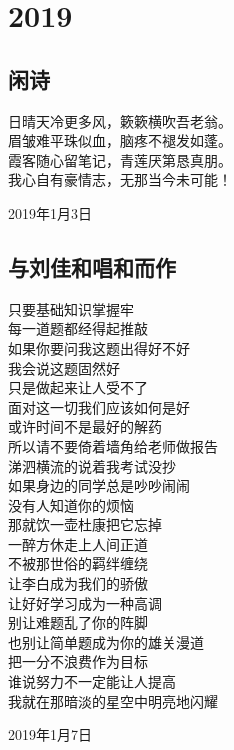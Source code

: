 \documentclass[a5paper]{ctexart}
\begin{document}
	\section{2019}
	
	\subsection{闲诗}
	\begin{center}
		
		日晴天冷更多风，簌簌横吹吾老翁。\\
		眉皱难平珠似血，脑疼不褪发如蓬。\\
		霞客随心留笔记，青莲厌第恳真朋。\\
		我心自有豪情志，无那当今未可能！
	\end{center}
	\hfill 2019年1月3日
	
	\subsection{与刘佳和唱和而作}
	\begin{center}
		只要基础知识掌握牢\\
		每一道题都经得起推敲\\
		如果你要问我这题出得好不好\\
		我会说这题固然好\\
		只是做起来让人受不了\\
		面对这一切我们应该如何是好\\
		或许时间不是最好的解药\\
		所以请不要倚着墙角给老师做报告\\
		涕泗横流的说着我考试没抄\\
		如果身边的同学总是吵吵闹闹\\
		没有人知道你的烦恼\\
		那就饮一壶杜康把它忘掉\\
		一醉方休走上人间正道\\
		不被那世俗的羁绊缠绕\\
		让李白成为我们的骄傲\\
		让好好学习成为一种高调\\
		别让难题乱了你的阵脚\\
		也别让简单题成为你的雄关漫道\\
		把一分不浪费作为目标\\
		谁说努力不一定能让人提高\\
		我就在那暗淡的星空中明亮地闪耀
	\end{center}
	\hfill 2019年1月7日
	
\end{document}

